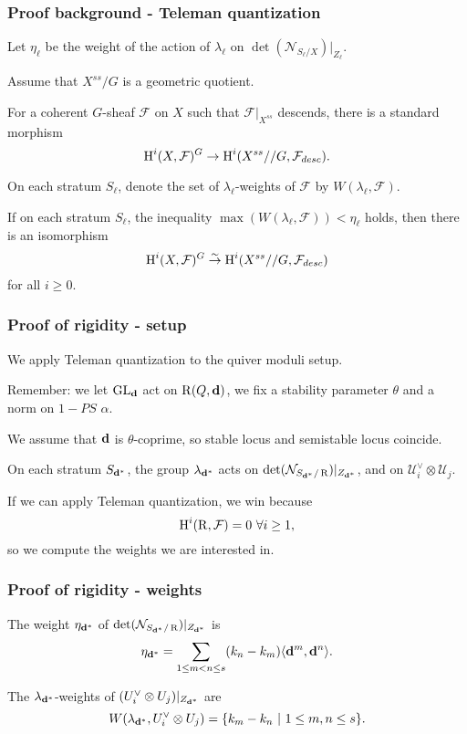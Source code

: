 \documentclass{beamer}
\begin{document}
\begin{frame}
    \frametitle{Proof background - Teleman quantization}
Let $\eta_{\ell}$ be the weight of the action of $\lambda_{\ell}$ on
$\det(\mathcal{N}_{S_{\ell}/X})|_{Z_{\ell}}$. \pause

Assume that $X^{ss}/G$ is a geometric quotient. \pause

For a coherent $G$-sheaf $\mathcal{F}$ on $X$ 
such that $\mathcal{F}|_{X^{ss}}$ descends,
there is a standard morphism
\[\HH^{i}(X, \mathcal{F})^{G} \to \HH^{i}(X^{ss} // G, \mathcal{F}_{desc}).\] \pause
\begin{theorem}
On each stratum $S_{\ell}$,
denote the set of $\lambda_{\ell}$-weights of $\mathcal{F}$
by $W(\lambda_{\ell}, \mathcal{F})$. \pause

If on each stratum $S_{\ell}$, the inequality $\max(W(\lambda_{\ell}, \mathcal{F})) < \eta_{\ell}$
holds, then there is an isomorphism
\[\HH^{i}(X, \mathcal{F})^{G} \to[\sim] \HH^{i}(X^{ss} // G, \mathcal{F}_{desc})\]
for all $i \geq 0$.
\end{theorem}

\end{frame}

\begin{frame}
    \frametitle{Proof of rigidity - setup}
We apply Teleman quantization to the quiver moduli setup. \pause

Remember: we let $\group$ act on $\parameterspace(Q, \tuple{d})$,
we fix a stability parameter $\theta$ and a norm on $1-PS$ $\alpha$. \pause

We assume that $\tuple{d}$ is $\theta$-coprime,
so stable locus and semistable locus coincide.

On each stratum $S_{\tuple{d}^*}$, the group $\lambda_{\tuple{d}^*}$
acts on $\det(\mathcal{N}_{S_{\tuple{d}^*}/\parameterspace})|_{Z_{\tuple{d}^*}}$, \pause
and on $\mathcal{U}^{\vee}_i \otimes \mathcal{U}_j$. \pause

If we can apply Teleman quantization, we win because
\[\HH^i(\parameterspace, \mathcal{F}) = 0 ~\forall i \geq 1,\]
so we compute the weights we are interested in.
\end{frame}

\begin{frame}
    \frametitle{Proof of rigidity - weights}
\begin{lemma}
The weight $\eta_{\tuple{d}^*}$ of $\det(\mathcal{N}_{S_{\tuple{d}^*}/\parameterspace})|_{Z_{\tuple{d}^*}}$ is
\[\eta_{\tuple{d}^*} = \sum_{1 \leq m < n \leq s} (k_n - k_m)\langle \tuple{d}^m, \tuple{d}^n \rangle.\]
\end{lemma} \pause

\begin{lemma}
    The $\lambda_{\tuple{d}^*}$-weights of $(U^{\vee}_i \otimes {U}_j)|_{Z_{\tuple{d}^*}}$ are
    \[W(\lambda_{\tuple{d}^*}, U_i^{\vee} \otimes U_j) = \{k_m - k_n ~|~ 1 \leq m, n \leq s\}.\]
\end{lemma}

\end{frame}
\end{document}
